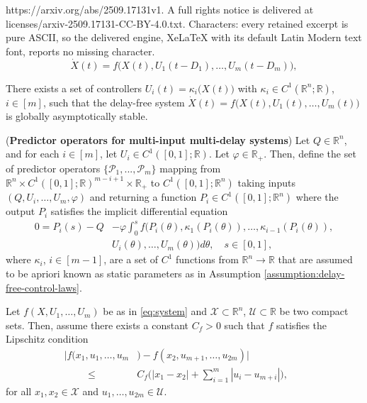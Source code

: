 \documentclass[10pt,a4paper]{amsart}
\begin{document}
https://arxiv.org/abs/2509.17131v1. A full rights notice is delivered at licenses/arxiv-2509.17131-CC-BY-4.0.txt. Characters: every retained excerpt is pure ASCII, so the delivered engine, XeLaTeX with its default Latin Modern text font, reports no missing character.
\begin{equation}
    \dot{X}(t) = f \bigg( X(t), U_1(t-D_1), \dots, U_m(t-D_m) \bigg), \label{eq:system}
\end{equation}

\begin{assumption}\label{assumption:delay-free-control-laws}
There exists a set of controllers $U_i(t) = \kappa_i \big( X(t)\big)$ with $\kappa_i \in C^1(\mathbb{R}^n;\mathbb{R})$, $i \in [m]$, such that the delay-free system $\dot{X}(t) = f \bigg( X(t), U_1(t), \dots, U_m(t) \bigg)$ is globally asymptotically stable.
\end{assumption}

\begin{definition}\label{def:delay_dependent_predictor_operators}
(\textbf{Predictor operators for multi-input multi-delay systems}) Let $Q \in \mathbb{R}^n$, and for each $i \in [m]$, let $U_i \in C^1([0,1];\mathbb{R})$. Let $\varphi \in \mathbb{R}_+$. Then, define the set of predictor operators $\{\mathcal{P}_1, ..., \mathcal{P}_m\}$ mapping from $\mathbb{R}^n \times C^1([0,1];\mathbb{R})^{m-i+1} \times \mathbb{R}_+$ to $C^1([0,1];\mathbb{R}^n)$ taking
 inputs $(Q,U_i,\dots,U_m, \varphi)$ and returning a function $P_i \in C^1([0,1];\mathbb{R}^n)$ where the output $P_i$ satisfies the implicit differential equation
\begin{align}
    0 = P_i(s) - Q& - \varphi \int_0^s f(P_i(\theta), \kappa_1(P_i(\theta)), \dots, \kappa_{i-1}(P_i(\theta)),\nonumber \\ 
    &U_i(\theta), \dots, U_m(\theta)) d\theta , \quad s \in [0,1], \label{eq:predictor_def_Pi}
\end{align}
where $\kappa_i$, $i \in [m-1]$, are a set of $C^1$ functions from $\mathbb{R}^n \to \mathbb{R}$ that are assumed to be apriori known as static parameters as in Assumption \ref{assumption:delay-free-control-laws}.
\end{definition}

\begin{assumption}\label{assumption:lipschitz}
Let $f(X,U_1,\dots,U_m)$ be as in \eqref{eq:system} and $\mathcal{X} \subset \mathbb{R}^n$, $\mathcal{U} \subset \mathbb{R}$ be two compact sets. Then, assume there exists a constant $C_f > 0$ such that $f$ satisfies the Lipschitz condition
\begin{align}
    \big| f(x_1,u_1,\dots,u_m&)-f(x_2,u_{m+1},\dots,u_{2m}) \big|\nonumber  &&\\ \hspace{1cm} \leq& C_f \bigg( |x_1-x_2| + \sum_{i=1}^m |u_i - u_{m+i}| \bigg),
\end{align}
for all $x_1,x_2 \in \mathcal{X}$ and $u_1,\dots,u_{2m} \in \mathcal{U}$.
\end{assumption}
\end{document}
